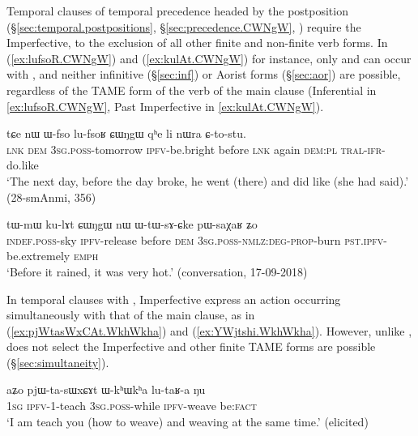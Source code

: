 Temporal clauses of temporal precedence headed by the postposition  (§\ref{sec:temporal.postpositions}, §\ref{sec:precedence.CWNgW}, \citealt[286--287]{jacques14linking}) require the Imperfective, to the exclusion of all other finite and non-finite verb forms. In (\ref{ex:lufsoR.CWNgW}) and (\ref{ex:kulAt.CWNgW}) for instance, only  and  can occur with , and neither infinitive (§\ref{sec:inf}) or Aorist forms (§\ref{sec:aor}) are possible, regardless of the TAME form of the verb of the main clause (Inferential in \ref{ex:lufsoR.CWNgW}, Past Imperfective in \ref{ex:kulAt.CWNgW}).

\begin{exe}
\ex \label{ex:lufsoR.CWNgW}
\gll tɕe nɯ ɯ-fso lu-fsoʁ ɕɯŋgɯ qʰe li nɯra ɕ-to-stu. \\
\textsc{lnk} \textsc{dem} \textsc{3sg}.\textsc{poss}-tomorrow \textsc{ipfv}-be.bright before \textsc{lnk} again \textsc{dem}:\textsc{pl} \textsc{tral}-\textsc{ifr}-do.like \\
\glt `The next day, before the day broke, he went (there) and did like (she had said).' (28-smAnmi, 356)
\end{exe}

\begin{exe}
\ex \label{ex:kulAt.CWNgW}
\gll tɯ-mɯ ku-lɤt ɕɯŋgɯ nɯ ɯ-tɯ-sɤ-ɕke pɯ-saχaʁ ʑo \\
\textsc{indef}.\textsc{poss}-sky \textsc{ipfv}-release before \textsc{dem} \textsc{3sg}.\textsc{poss}-\textsc{nmlz}:\textsc{deg}-\textsc{prop}-burn \textsc{pst}.\textsc{ipfv}-be.extremely \textsc{emph} \\
\glt `Before it rained, it was very hot.' (conversation, 17-09-2018)
\end{exe}

In temporal clauses with , Imperfective express an action occurring simultaneously with that of the main clause, as in (\ref{ex:pjWtasWxCAt.WkhWkha}) and (\ref{ex:YWjtshi.WkhWkha}). However, unlike ,  does not select the Imperfective and other finite TAME forms are possible (§\ref{sec:simultaneity}).

\begin{exe}
\ex \label{ex:pjWtasWxCAt.WkhWkha}
\gll aʑo pjɯ-ta-sɯxɕɤt ɯ-kʰɯkʰa lu-taʁ-a ŋu \\
\textsc{1sg} \textsc{ipfv}-1\fl{}-teach \textsc{3sg}.\textsc{poss}-while \textsc{ipfv}-weave be:\textsc{fact} \\
\glt `I am teach you (how to weave) and weaving at the same time.' (elicited)
\end{exe}

